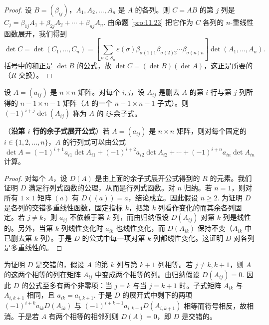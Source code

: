 \begin{proof}
设 \(B = (\beta_{ij})\)，\(A_1, A_2, \ldots, A_n\) 是 \(A\) 的各列。则 \(C = AB\) 的第 \(j\) 列是 \(C_j = \beta_{1j}A_1+\beta_{2j}A_2+\cdots+\beta_{nj}A_n\). 由命题 \ref{pro:11.23} 把它作为 \(C\) 各列的 \(n\)-重线性函数展开，我们得到
\[
\det C = \det(C_1, \ldots, C_n) = \left[\sum_{\sigma \in S_n}\varepsilon(\sigma)\beta_{\sigma(1)1}\beta_{\sigma(2)2}\cdots\beta_{\sigma(n)n}\right]\det(A_1, \ldots, A_n).
\]
括号中的和正是 \(\det B\) 的公式，故 \(\det C = (\det B)(\det A)\)，这正是所要的（\(R\) 交换）。
\end{proof}

\begin{definition}
设 \(A = (a_{ij})\) 是 \(n \times n\) 矩阵。对每个 \(i, j\)，设 \(A_{ij}\) 是删去 \(A\) 的第 \(i\) 行与第 \(j\) 列所得的 \(n-1 \times n-1\) 矩阵（\(A\) 的一个 \(n-1 \times n-1\) 子式）。则 \((-1)^{i+j}\det(A_{ij})\) 称为 \(A\) 的 \(ij\)-余子式。
\end{definition}

\begin{theorem}\label{thm:11.29}
（\textbf{沿第 \(i\) 行的余子式展开公式}）若 \(A = (a_{ij})\) 是 \(n \times n\) 矩阵，则对每个固定的 \(i \in \{1, 2, \ldots, n\}\)，\(A\) 的行列式可以由公式
\[
\det A = (-1)^{i+1}a_{i1}\det A_{i1}+(-1)^{i+2}a_{i2}\det A_{i2}+\cdots+(-1)^{i+n}a_{in}\det A_{in}
\]
计算。
\end{theorem}

\begin{proof}
对每个 \(A\)，设 \(D(A)\) 是由上面的余子式展开公式得到的 \(R\) 的元素。我们证明 \(D\) 满足行列式函数的公理，从而是行列式函数。对 \(n\) 归纳。若 \(n = 1\)，则对所有 \(1 \times 1\) 矩阵 \((a)\) 有 \(D((a)) = a\)，结论成立。因此假设 \(n \geq 2\). 为证明 \(D\) 是各列的交错多重线性函数，固定指标 \(k\)，把第 \(k\) 列看作变化的而其余各列固定。若 \(j \neq k\)，则 \(a_{ij}\) 不依赖于第 \(k\) 列，而由归纳假设 \(D(A_{ij})\) 对第 \(k\) 列是线性的。另外，当第 \(k\) 列线性变化时 \(a_{ik}\) 也线性变化，而 \(D(A_{ik})\) 保持不变（\(A_{ik}\) 中已删去第 \(k\) 列）。于是 \(D\) 的公式中每一项对第 \(k\) 列都线性变化。这证明 \(D\) 对各列是多重线性的。
\end{proof}

为证明 \(D\) 是交错的，假设 \(A\) 的第 \(k\) 列与第 \(k+1\) 列相等。若 \(j \neq k, k+1\)，则 \(A\) 的这两个相等的列在矩阵 \(A_{ij}\) 中变成两个相等的列。由归纳假设 \(D(A_{ij}) = 0\). 因此 \(D\) 的公式至多有两个非零项：当 \(j = k\) 与当 \(j = k+1\) 时。子式矩阵 \(A_{ik}\) 与 \(A_{i,k+1}\) 相同，且 \(a_{ik} = a_{i,k+1}\). 于是 \(D\) 的展开式中剩下的两项 \((-1)^{i+k}a_{ik}D(A_{ik})\) 与 \((-1)^{i+k+1}a_{i,k+1}D(A_{i,k+1})\) 相等而符号相反，故相消。于是若 \(A\) 有两个相等的相邻列则 \(D(A) = 0\)，即 \(D\) 是交错的。

